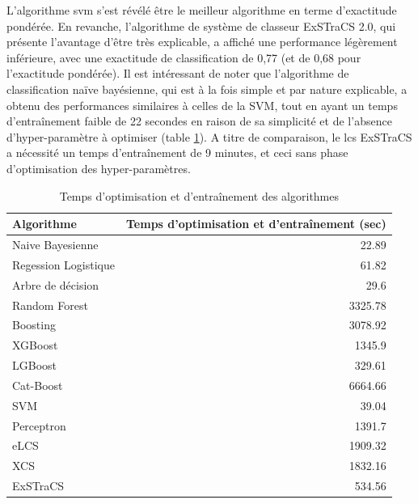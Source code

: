 L'algorithme \gls{svm} s'est révélé être le meilleur algorithme en terme d'exactitude pondérée. En revanche, l'algorithme de système de classeur ExSTraCS 2.0, qui présente l'avantage d'être très explicable, a affiché une performance légèrement inférieure, avec une exactitude de classification de 0,77 (et de 0,68 pour l'exactitude pondérée). Il est intéressant de noter que l'algorithme de classification naïve bayésienne, qui est à la fois simple et par nature explicable, a obtenu des performances similaires à celles de la SVM, tout en ayant un temps d'entraînement faible de 22 secondes en raison de sa simplicité et de l'absence d'hyper-paramètre à optimiser (table \ref{tab:pipeline_times}). A titre de comparaison, le \gls{lcs} ExSTraCS a nécessité un temps d'entraînement de  9 minutes, et ceci sans phase d'optimisation des hyper-paramètres.
\begin{table}[h]
    \centering
    \begin{tabular}{lr}
        \toprule
        Algorithme & Temps d'optimisation et d'entraînement (sec) \\
        \midrule
        Naive Bayesienne & 22.89 \\
        Regession Logistique & 61.82 \\
        Arbre de décision & 29.6 \\
        Random Forest & 3325.78 \\
        Boosting & 3078.92 \\
        XGBoost & 1345.9 \\
        LGBoost & 329.61 \\
        Cat-Boost & 6664.66 \\
        SVM & 39.04 \\
        Perceptron & 1391.7 \\
        eLCS & 1909.32 \\
        XCS & 1832.16 \\
        ExSTraCS & 534.56 \\
        \bottomrule
    \end{tabular}
    \caption{Temps d'optimisation et d'entraînement des algorithmes}
    \label{tab:pipeline_times}
\end{table}
